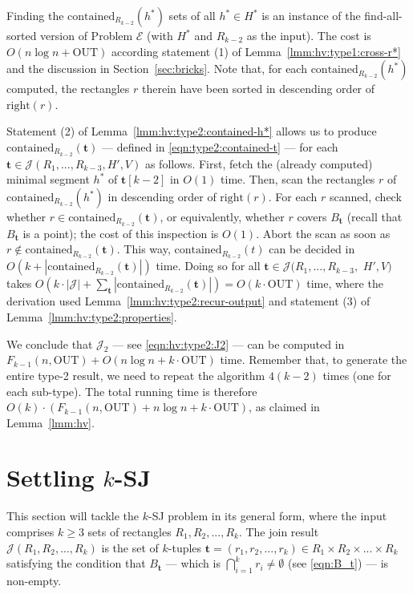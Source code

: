 \documentclass[acmsmall,review,anonymous]{acmart}
\def\vgap{\vspace{1mm}}
\def\extraspacing{\vspace{2mm} \noindent}
\def\J{\mathcal{J}}
\def\xright{\mathrm{right}}
\def\contained{\mathrm{contained}}
\def\out{\mathrm{OUT}}
\begin{document}
{{{Finding the $\contained_{R_{k-2}}(h^*)$ sets of all $h^* \in H^*$ is an instance of the find-all-sorted version of Problem $\mathscr{E}$ (with $H^*$ and $R_{k-2}$ as the input). The cost is $O(n \log n + \out)$ according statement (1) of Lemma~\ref{lmm:hv:type1:cross-r*} and the discussion in Section~\ref{sec:bricks}. Note that, for each $\contained_{R_{k-2}}(h^*)$ computed, the rectangles $r$ therein have been sorted in descending order of $\xright(r)$.


\extraspacing {\bf Computing the ``$\bm{\contained_{R_{k-2}}(t)}$'' Sets.} Statement (2) of Lemma~\ref{lmm:hv:type2:contained-h*} allows us to produce $\contained_{R_{k-2}}(\bm{t})$ --- defined in \eqref{eqn:type2:contained-t} --- for each $\bm{t} \in \J(R_1, ..., R_{k-3}, H', V)$ as follows. First, fetch the (already computed) minimal segment $h^*$ of $\bm{t}[k-2]$ in $O(1)$ time. Then, scan the rectangles $r$ of $\contained_{R_{k-2}}(h^*)$ in descending order of $\xright(r)$. For each $r$ scanned, check whether $r \in \contained_{R_{k-2}}(\bm{t})$, or equivalently, whether $r$ covers $B_\bm{t}$ (recall that $B_\bm{t}$ is a point); the cost of this inspection is $O(1)$. Abort the scan as soon as $r \notin
\contained_{R_{k-2}}(\bm{t})$. This way, $\contained_{R_{k-2}}(t)$ can be decided in $O(k + |\contained_{R_{k-2}}(\bm{t})|)$ time. Doing so for all $\bm{t} \in \J(R_1, ..., R_{k-3},$ $H', V)$ takes $O(k \cdot |\J| + \sum_\bm{t} |\contained_{R_{k-2}}(\bm{t})|) = O(k \cdot \out)$ time, where the derivation used Lemma~\ref{lmm:hv:type2:recur-output} and statement (3) of Lemma~\ref{lmm:hv:type2:properties}.



\vgap 

We conclude that $\J_2$ --- see \eqref{eqn:hv:type2:J2} --- can be computed in $F_{k-1}(n, \out) + O(n \log n +  k \cdot \out)$ time. Remember that, to generate the entire type-2 result, we need to repeat the algorithm $4(k-2)$ times (one for each sub-type). The total running time is therefore $O(k) \cdot (F_{k-1}(n, \out) + n \log n +  k \cdot \out)$, as claimed in Lemma~\ref{lmm:hv}.


\section{Settling $k$-SJ} \label{sec:ksj}

This section will tackle the $k$-SJ problem in its general form, where the input comprises $k \ge 3$ sets of rectangles $R_1, R_2, ..., R_k$. The join result $\J(R_1, R_2, ..., R_k)$ is the set of $k$-tuples $\bm{t} = (r_1, r_2, ..., r_k) \in R_1 \times R_2 \times ... \times R_k$ satisfying the condition that $B_\bm{t}$ --- which is $\bigcap_{i=1}^k r_i \ne \emptyset$ (see \eqref{eqn:B_t}) --- is non-empty.

}}}
\end{document}
